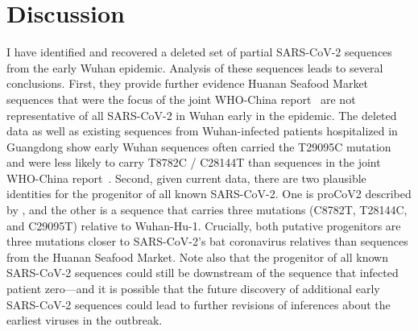 \documentclass[9pt,twocolumn,twoside]{gsajnl_modified}
\begin{document}
\section{Discussion}
I have identified and recovered a deleted set of partial SARS-CoV-2 sequences from the early Wuhan epidemic.
Analysis of these sequences leads to several conclusions.
First, they provide further evidence Huanan Seafood Market sequences that were the focus of the joint WHO-China report~\citep{WHO2021origins} are not representative of all SARS-CoV-2 in Wuhan early in the epidemic.
The deleted data as well as existing sequences from Wuhan-infected patients hospitalized in Guangdong show early Wuhan sequences often carried the T29095C mutation and were less likely to carry T8782C / C28144T than sequences in the joint WHO-China report~\citep{WHO2021origins}.
Second, given current data, there are two plausible identities for the progenitor of all known SARS-CoV-2.
One is proCoV2 described by \citet{kumar2021evolutionary}, and the other is a sequence that carries three mutations (C8782T, T28144C, and C29095T) relative to Wuhan-Hu-1.
Crucially, both putative progenitors are three mutations closer to SARS-CoV-2's bat coronavirus relatives than sequences from the Huanan Seafood Market.
Note also that the progenitor of all known SARS-CoV-2 sequences could still be downstream of the sequence that infected patient zero---and it is possible that the future discovery of additional early SARS-CoV-2 sequences could lead to further revisions of inferences about the earliest viruses in the outbreak.
\end{document}
